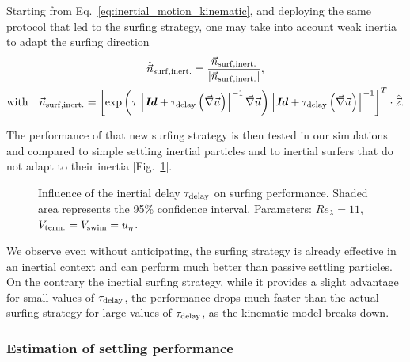 Starting from Eq.~\eqref{eq:inertial_motion_kinematic}, and deploying the same protocol that led to the surfing strategy, one may take into account weak inertia to adapt the surfing direction
\begin{multline}
	\hat{\vec{n}}_{\mathrm{surf}, \mathrm{inert.}} = \frac{\vec{n}_{\mathrm{surf}, \mathrm{inert.}}}{\lvert\vec{n}_{\mathrm{surf}, \mathrm{inert.}}\rvert}, \\ 
	\text{with} \quad \vec{n}_{\mathrm{surf}, \mathrm{inert.}} = \left[ \exp \left( \tau \left[ \boldsymbol{\mathit{Id}} + \tau_{\mathrm{delay}} \left(\vec{\nabla} \vec{u}\right) \right]^{-1} \vec{\nabla} \vec{u} \right) \left[ \boldsymbol{\mathit{Id}} + \tau_{\mathrm{delay}} \left(\vec{\nabla} \vec{u}\right) \right]^{-1} \right]^T \cdot \hat{\vec{z}}.
\end{multline}

The performance of that new surfing strategy is then tested in our simulations and compared to simple settling inertial particles and to inertial surfers that do not adapt to their inertia [Fig.~\ref{fig:passive_inertial_surf}].
\begin{figure}%
	\centering
	
	\caption[Influence of the inertial delay $\InertialDelay$ on surfing performance.]{
		Influence of the inertial delay $\InertialDelay$ on surfing performance.
		Shaded area represents the 95\% confidence interval.
		Parameters: $\mathit{Re}_{\lambda} = 11$, $V_{\mathrm{term.}} = V_{\mathrm{swim}} = u_{\eta}$.
	}
	\label{fig:passive_inertial_surf}
\end{figure}
We observe even without anticipating, the surfing strategy is already effective in an inertial context and can perform much better than passive settling particles.
On the contrary the inertial surfing strategy, while it provides a slight advantage for small values of $\InertialDelay$, the performance drops much faster than the actual surfing strategy for large values of $\InertialDelay$, as the kinematic model breaks down.

\subsubsection{Estimation of settling performance}

